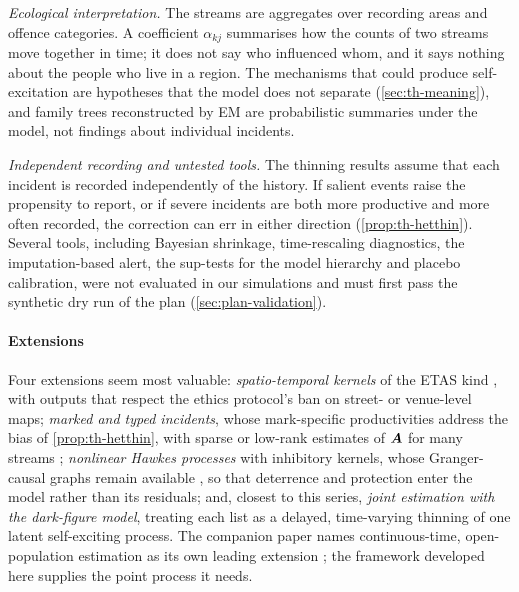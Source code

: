 \emph{Ecological interpretation.} The streams are aggregates over recording
areas and offence categories. A coefficient $\alpha_{kj}$ summarises how the
counts of two streams move together in time; it does not say who influenced
whom, and it says nothing about the people who live in a region. The
mechanisms that could produce self-excitation are hypotheses that the model
does not separate (\cref{sec:th-meaning}), and family trees reconstructed by
EM are probabilistic summaries under the model, not findings about individual
incidents.

\emph{Independent recording and untested tools.} The thinning results assume
that each incident is recorded independently of the history. If salient
events raise the propensity to report, or if severe incidents are both more
productive and more often recorded, the correction can err in either
direction (\cref{prop:th-hetthin}). Several tools, including Bayesian
shrinkage, time-rescaling diagnostics, the imputation-based alert, the
sup-tests for the model hierarchy and placebo calibration, were not evaluated
in our simulations and must first pass the synthetic dry run of the plan
(\cref{sec:plan-validation}).

\paragraph{Extensions}
Four extensions seem most valuable: \emph{spatio-temporal kernels} of the ETAS kind
\citep{ogata1988,mohler2011,reinhart2018}, with outputs that respect the ethics protocol's
ban on street- or venue-level maps; \emph{marked and typed incidents}, whose
mark-specific productivities address the bias of \cref{prop:th-hetthin}, with sparse or
low-rank estimates of $\bm{A}$ for many streams \citep{zhou2013,hansen2015};
\emph{nonlinear Hawkes processes} with inhibitory kernels, whose Granger-causal graphs
remain available \citep{eichler2017}, so that deterrence and protection enter the model
rather than its residuals; and, closest to this series, \emph{joint estimation with the
dark-figure model}, treating each list as a delayed, time-varying thinning of one latent
self-exciting process. The companion paper names continuous-time, open-population
estimation as its own leading extension \citep{kornsteinlab2026darkfigure}; the framework
developed here supplies the point process it needs.

